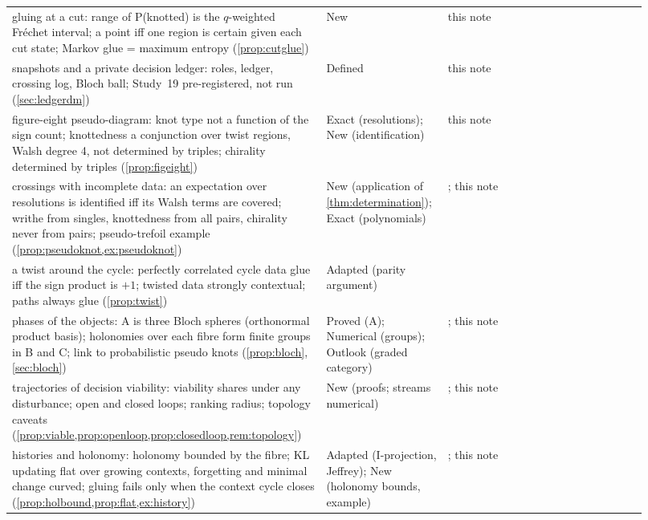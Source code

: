 \documentclass[11pt]{article}
\theoremstyle{definition}\newtheorem{definition}[theorem]{Definition}\newtheorem{remark}[theorem]{Remark}\newtheorem{example}[theorem]{Example}\newtheorem{problem}[theorem]{Open problem}\crefname{problem}{Problem}{Problems}
\begin{document}
{\begin{longtable}{p{0.46\linewidth}p{0.16\linewidth}p{0.3\linewidth}}
\rowcolor{stNew} gluing at a cut: range of P(knotted) is the $q$-weighted Fr\'echet interval; a point iff one region is certain given each cut state; Markov glue = maximum entropy (\cref{prop:cutglue}) & New & this note\\
\rowcolor{stNew} snapshots and a private decision ledger: roles, ledger, crossing log, Bloch ball; Study~19 pre-registered, not run (\cref{sec:ledgerdm}) & Defined & this note\\
\rowcolor{stNew} figure-eight pseudo-diagram: knot type not a function of the sign count; knottedness a conjunction over twist regions, Walsh degree 4, not determined by triples; chirality determined by triples (\cref{prop:figeight}) & Exact (resolutions); New (identification) & this note\\
\rowcolor{stNew} crossings with incomplete data: an expectation over resolutions is identified iff its Walsh terms are covered; writhe from singles, knottedness from all pairs, chirality never from pairs; pseudo-trefoil example (\cref{prop:pseudoknot,ex:pseudoknot}) & New (application of \cref{thm:determination}); Exact (polynomials) & \cite{DiamantisKauffman2026}; this note\\
\rowcolor{stAdapted} a twist around the cycle: perfectly correlated cycle data glue iff the sign product is $+1$; twisted data strongly contextual; paths always glue (\cref{prop:twist}) & Adapted (parity argument) & \cite{AraujoEtAl2013,Mermin1990,HeuslerSchlummerUbben2020}\\
\rowcolor{stNew} phases of the objects: A is three Bloch spheres (orthonormal product basis); holonomies over each fibre form finite groups in B and C; link to probabilistic pseudo knots (\cref{prop:bloch}, \cref{sec:bloch}) & Proved (A); Numerical (groups); Outlook (graded category) & \cite{DiamantisKauffman2026}; this note\\
\rowcolor{stNew} trajectories of decision viability: viability shares under any disturbance; open and closed loops; ranking radius; topology caveats (\cref{prop:viable,prop:openloop,prop:closedloop,rem:topology}) & New (proofs; streams numerical) & \cite{Aubin1991,DiamantisKauffman2026}; this note\\
\rowcolor{stNew} histories and holonomy: holonomy bounded by the fibre; KL updating flat over growing contexts, forgetting and minimal change curved; gluing fails only when the context cycle closes (\cref{prop:holbound,prop:flat,ex:history}) & Adapted (I-projection, Jeffrey); New (holonomy bounds, example) & \cite{Csiszar1975,DiaconisZabell1982,TohmeCaterinaGangle2017}; this note\\

\end{longtable}}
\end{document}
